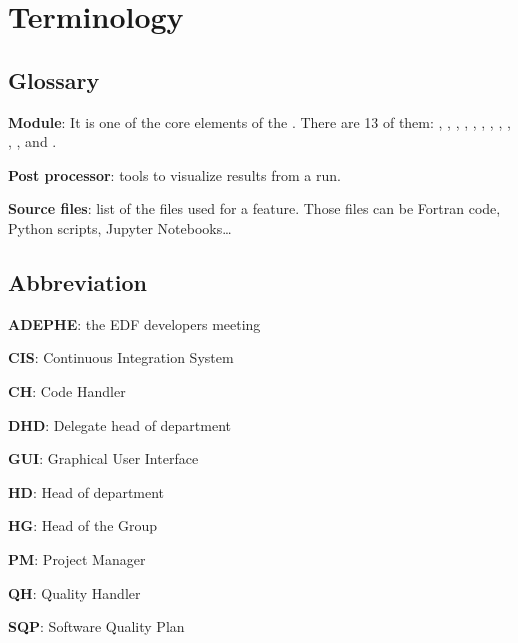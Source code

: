 \chapter{Terminology}

\section{Glossary}

\textbf{Module}: It is one of the core elements of the \telemacsystem. There
are 13 of them: , , \tomawac, \artemis, \sisyphe,
\gaia, \khione, \postel, \bief, \stbtel, \waqtel{}, \mascaret and \courlis.

\textbf{Post processor}: tools to visualize results from a \telemacsystem{}
run.

\textbf{Source files}: list of the files used for a feature. Those files can be
Fortran code, Python scripts, Jupyter Notebooks\ldots

\section{Abbreviation}

\textbf{ADEPHE}: the \telemacsystem{} EDF developers meeting

\textbf{CIS}: Continuous Integration System

\textbf{CH}: Code Handler

\textbf{DHD}: Delegate head of department

\textbf{GUI}: Graphical User Interface

\textbf{HD}: Head of department

\textbf{HG}: Head of the Group

\textbf{PM}: Project Manager

\textbf{QH}: Quality Handler

\textbf{SQP}: Software Quality Plan

